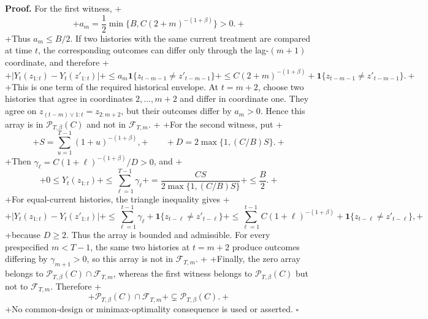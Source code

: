 \textbf{Proof.} For the first witness,
+\[
+a_m=\frac12\min\{B,C(2+m)^{-(1+\beta)}\}>0.
+\]
+Thus \(a_m\le B/2\). If two histories with the same current treatment are compared at time \(t\), the corresponding outcomes can differ only through the lag-\((m+1)\) coordinate, and therefore
+\[
+\left|Y_t(z_{1:t})-Y_t(z'_{1:t})\right|
+\le a_m\mathbf 1\{z_{t-m-1}\ne z'_{t-m-1}\}
+\le C(2+m)^{-(1+\beta)}
+\mathbf 1\{z_{t-m-1}\ne z'_{t-m-1}\}.
+\]
+This is one term of the required historical envelope. At \(t=m+2\), choose two histories that agree in coordinates \(2,\ldots,m+2\) and differ in coordinate one. They agree on \(z_{(t-m)\vee1:t}=z_{2:m+2}\), but their outcomes differ by \(a_m>0\). Hence this array is in \(\mathcal P_{T,\beta}(C)\) and not in \(\mathcal F_{T,m}\).
+
+For the second witness, put
+\[
+S=\sum_{u=1}^{T-1}(1+u)^{-(1+\beta)},
+\qquad
+D=2\max\{1,(C/B)S\}.
+\]
+Then \(\gamma_\ell=C(1+\ell)^{-(1+\beta)}/D>0\), and
+\[
+0\le Y_t(z_{1:t})
+\le\sum_{\ell=1}^{T-1}\gamma_\ell
+=\frac{CS}{2\max\{1,(C/B)S\}}
+\le\frac B2.
+\]
+For equal-current histories, the triangle inequality gives
+\[
+\left|Y_t(z_{1:t})-Y_t(z'_{1:t})\right|
+\le\sum_{\ell=1}^{t-1}\gamma_\ell
+\mathbf1\{z_{t-\ell}\ne z'_{t-\ell}\}
+\le\sum_{\ell=1}^{t-1}C(1+\ell)^{-(1+\beta)}
+\mathbf1\{z_{t-\ell}\ne z'_{t-\ell}\},
+\]
+because \(D\ge2\). Thus the array is bounded and admissible. For every prespecified \(m<T-1\), the same two histories at \(t=m+2\) produce outcomes differing by \(\gamma_{m+1}>0\), so this array is not in \(\mathcal F_{T,m}\).
+
+Finally, the zero array belongs to \(\mathcal P_{T,\beta}(C)\cap\mathcal F_{T,m}\), whereas the first witness belongs to \(\mathcal P_{T,\beta}(C)\) but not to \(\mathcal F_{T,m}\). Therefore
+\[
+\mathcal P_{T,\beta}(C)\cap\mathcal F_{T,m}
+\subsetneq\mathcal P_{T,\beta}(C).
+\]
+No common-design or minimax-optimality consequence is used or asserted. \(\square\)